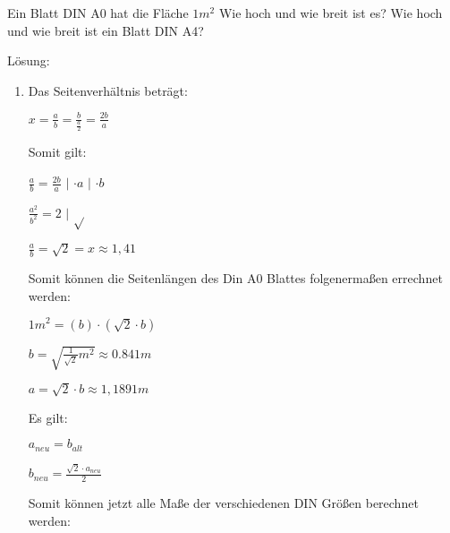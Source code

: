 \documentclass[main.tex]{subfiles}
\begin{document}
\begin{enumerate}
	      Ein Blatt DIN A0 hat die Fläche \(
	      1 m^2
	      \)
	      Wie hoch und wie breit ist es?
	      Wie hoch und wie breit ist ein Blatt DIN A4?

	      Lösung:
	      \begin{enumerate}
		      \item Das Seitenverhältnis beträgt:

		            \(
		            x = \frac{a}{b}
		            = \frac{b}{
			            \frac{a}{2}
		            }
		            = \frac{2b}{a}
		            \)

		            Somit gilt:

		            \(
		            \frac{a}{b} = \frac{2b}{a}
		            \)
		            \(|\)
		            \(
		            \cdot a
		            \)
		            \(|\)
		            \(
		            \cdot b
		            \)

		            \(
		            \frac{a^2}{b^2} = 2
		            \)
		            \(|\)
		            \(
		            \sqrt{}
		            \)

		            \(
		            \frac{a}{b}
		            = \sqrt{2}
		            = x
		            \approx 1,41
		            \)

		            Somit können die Seitenlängen des Din A0 Blattes folgenermaßen
		            errechnet werden:

		            \(
		            1 m^2
		            = (b) \cdot (\sqrt{2} \cdot b)
		            \)

		            \(
		            b = \sqrt{
			            \frac{1}{\sqrt{2}} m^2
		            }
		            \approx 0.841 m
		            \)

		            \(
		            a = \sqrt{2} \cdot b
		            \approx 1,1891 m
		            \)

		            Es gilt:

		            \(
		            a_{neu} = b_{alt}
		            \)

		            \(
		            b_{neu} = \frac{ \sqrt{2} \cdot a_{neu}}{ 2 }
		            \)

		            Somit können jetzt alle Maße der verschiedenen DIN Größen berechnet werden:


\end{enumerate}
\end{enumerate}
\end{document}
